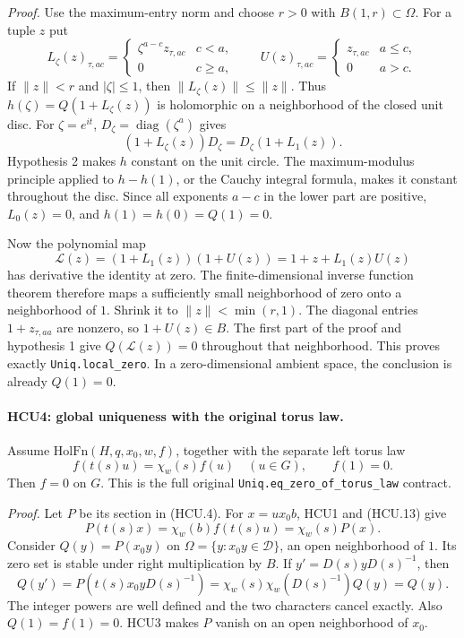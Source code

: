 \emph{Proof.}
Use the maximum-entry norm and choose \(r>0\) with
\(B(1,r)\subset\Omega\).  For a tuple \(z\) put
\[
 L_\zeta(z)_{\tau,ac}=
 \begin{cases}\zeta^{a-c}z_{\tau,ac}&c<a,\\0&c\ge a,\end{cases}
 \qquad
 U(z)_{\tau,ac}=
 \begin{cases}z_{\tau,ac}&a\le c,\\0&a>c.\end{cases}
 \tag{HCU.10}
\]
If \(\|z\|<r\) and \(|\zeta|\le1\), then
\(\|L_\zeta(z)\|\le\|z\|\).
Thus \(h(\zeta)=Q(1+L_\zeta(z))\) is holomorphic on a neighborhood of
the closed unit disc.  For \(\zeta=e^{it}\),
\(D_\zeta=\operatorname{diag}(\zeta^a)\) gives
\[
 (1+L_\zeta(z))D_\zeta=D_\zeta(1+L_1(z)).
 \tag{HCU.11}
\]
Hypothesis 2 makes \(h\) constant on the unit circle.
The maximum-modulus principle applied to \(h-h(1)\), or the Cauchy
integral formula, makes it constant throughout the disc.
Since all exponents \(a-c\) in the lower part are positive,
\(L_0(z)=0\), and \(h(1)=h(0)=Q(1)=0\).

Now the polynomial map
\[
 \mathcal L(z)=(1+L_1(z))(1+U(z))
       =1+z+L_1(z)U(z)
 \tag{HCU.12}
\]
has derivative the identity at zero.  The finite-dimensional inverse
function theorem therefore maps a sufficiently small neighborhood of
zero onto a neighborhood of \(1\).  Shrink it to \(\|z\|<\min(r,1)\).
The diagonal entries \(1+z_{\tau,aa}\) are nonzero, so \(1+U(z)\in B\).
The first part of the proof and hypothesis 1 give
\(Q(\mathcal L(z))=0\) throughout that neighborhood.  This proves
exactly \texttt{Uniq.local\_zero}.  In a zero-dimensional ambient space,
the conclusion is already \(Q(1)=0\).

\paragraph{HCU4: global uniqueness with the original torus law.}
\label{claim:HCU4}
Assume \(\mathrm{HolFn}(H,q,x_0,w,f)\), together with the separate
left torus law
\[
 f(t(s)u)=\chi_w(s)f(u)\quad(u\in G),\qquad f(1)=0.
 \tag{HCU.13}
\]
Then \(f=0\) on \(G\).  This is the full original
\texttt{Uniq.eq\_zero\_of\_torus\_law} contract.

\emph{Proof.}
Let \(P\) be its section in (HCU.4).  For \(x=ux_0b\), HCU1 and
(HCU.13) give
\[
 P(t(s)x)=\chi_w(b)f(t(s)u)=\chi_w(s)P(x).
 \tag{HCU.14}
\]
Consider \(Q(y)=P(x_0y)\) on
\(\Omega=\{y:x_0y\in\mathcal D\}\), an open neighborhood of \(1\).
Its zero set is stable under right multiplication by \(B\).
If \(y'=D(s)yD(s)^{-1}\), then
\[
 Q(y')=P(t(s)x_0yD(s)^{-1})
      =\chi_w(s)\chi_w(D(s)^{-1})Q(y)=Q(y).
 \tag{HCU.15}
\]
The integer powers are well defined and the two characters cancel
exactly.  Also \(Q(1)=f(1)=0\).  HCU3 makes \(P\) vanish on an open
neighborhood of \(x_0\).

